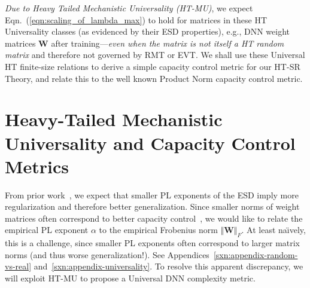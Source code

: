 \emph{Due to Heavy Tailed Mechanistic Universality (HT-MU)}, we expect Eqn.~(\ref{eqn:scaling_of_lambda_max}) to hold for matrices in these HT Universality classes (as evidenced by their ESD properties), e.g., DNN weight matrices $\mathbf{W}$ after training---\emph{even when the matrix is not itself a HT random matrix} and therefore not governed by RMT or EVT.
We shall use these Universal HT finite-size relations to derive a simple capacity control metric for our HT-SR Theory, and relate this to the well known Product Norm capacity control metric.




\vspace{-2mm}

\section{Heavy-Tailed Mechanistic Universality and Capacity Control Metrics}
\label{sxn:theory-new}

\vspace{-1mm}


%
From prior work~\cite{MM18_TR}, we expect that smaller PL exponents of the ESD imply more regularization and therefore better generalization. 
Since smaller norms of weight matrices often correspond to better capacity control~\cite{LMBx18_TR,SHNx17_TR,PLMx18_TR,BFT17_TR}, we would like to relate the empirical PL exponent $\alpha$ to the empirical Frobenius norm $\Vert\mathbf{W}\Vert_{F}$.
At least na\"{\i}vely, this is a challenge, since smaller PL exponents often correspond to larger matrix norms (and thus worse generalization!).
See Appendices~\ref{sxn:appendix-random-vs-real} and~\ref{sxn:appendix-universality}.
To resolve this apparent discrepancy, we will exploit HT-MU to propose a Universal DNN complexity metric.

